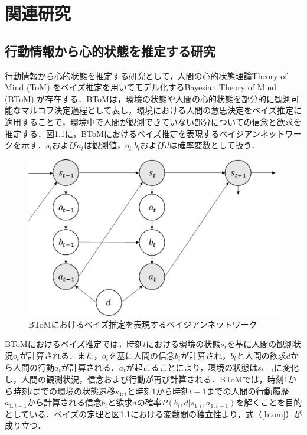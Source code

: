 \chapter{関連研究}

\section{行動情報から心的状態を推定する研究}
\par
行動情報から心的状態を推定する研究として，人間の心的状態理論Theory of Mind (ToM) \cite{子安増生1997心の理論}をベイズ推定を用いてモデル化するBayesian Theory of Mind (BToM) \cite{baker2011bayesian}が存在する．BToMは，環境の状態や人間の心的状態を部分的に観測可能なマルコフ決定過程\cite{alma9926438829904034}として表し，環境における人間の意思決定をベイズ推定に適用することで，環境中で人間が観測できていない部分についての信念と欲求を推定する．図\ref{fig:btom}に，BToMにおけるベイズ推定を表現するベイジアンネットワーク\cite{alma9926301926204034}を示す．$s_t$および$a_t$は観測値，$o_t$,$b_t$および$d$は確率変数として扱う．
\begin{figure}[htbp]
  \begin{center}
    \includegraphics[scale=0.7]{./btom.pdf}
    \caption{BToMにおけるベイズ推定を表現するベイジアンネットワーク}
    \label{fig:btom}
  \end{center}
\end{figure}
BToMにおけるベイズ推定では，時刻$t$における環境の状態$s_{t}$を基に人間の観測状況$o_{t}$が計算される．また，$o_{t}$を基に人間の信念$b_{t}$が計算され，$b_{t}$と人間の欲求$d$から人間の行動$a_{t}$が計算される．$a_{t}$が起こることにより，環境の状態は$s_{t+1}$に変化し，人間の観測状況，信念および行動が再び計算される．BToMでは，時刻$1$から時刻$t$までの環境の状態遷移$s_{1:t}$と時刻$1$から時刻$t-1$までの人間の行動履歴$a_{1:t-1}$から計算される信念$b_t$と欲求$d$の確率$P(b_t,d|s_{1:t},a_{1:t-1})$を解くことを目的としている．ベイズの定理\cite{ベイズ}と図\ref{fig:btom}における変数間の独立性\cite{ベイズ}より，式（\ref{btom}）が成り立つ．
